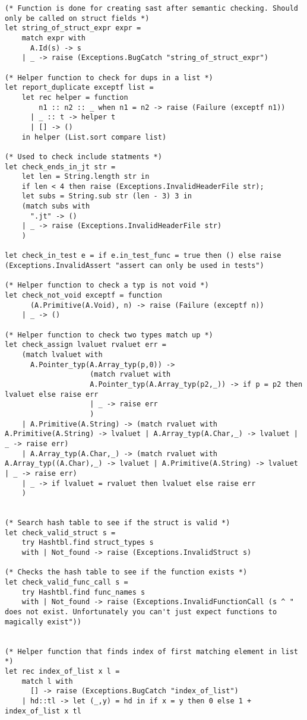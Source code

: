 \documentclass{article}
\begin{document}
\begin{lstlisting}
(* Function is done for creating sast after semantic checking. Should only be called on struct fields *)
let string_of_struct_expr expr = 
	match expr with
	  A.Id(s) -> s
	| _ -> raise (Exceptions.BugCatch "string_of_struct_expr")
	
(* Helper function to check for dups in a list *)
let report_duplicate exceptf list =
    let rec helper = function
        n1 :: n2 :: _ when n1 = n2 -> raise (Failure (exceptf n1))
      | _ :: t -> helper t
      | [] -> ()
    in helper (List.sort compare list)

(* Used to check include statments *)
let check_ends_in_jt str = 
	let len = String.length str in
	if len < 4 then raise (Exceptions.InvalidHeaderFile str);
	let subs = String.sub str (len - 3) 3 in
	(match subs with
	  ".jt" -> ()
	| _ -> raise (Exceptions.InvalidHeaderFile str)
	)

let check_in_test e = if e.in_test_func = true then () else raise (Exceptions.InvalidAssert "assert can only be used in tests")

(* Helper function to check a typ is not void *)
let check_not_void exceptf = function
      (A.Primitive(A.Void), n) -> raise (Failure (exceptf n))
    | _ -> ()

(* Helper function to check two types match up *)
let check_assign lvaluet rvaluet err =
	(match lvaluet with
	  A.Pointer_typ(A.Array_typ(p,0)) -> 
					(match rvaluet with
					A.Pointer_typ(A.Array_typ(p2,_)) -> if p = p2 then lvaluet else raise err
					| _ -> raise err
					)
	| A.Primitive(A.String) -> (match rvaluet with A.Primitive(A.String) -> lvaluet | A.Array_typ(A.Char,_) -> lvaluet | _ -> raise err)
	| A.Array_typ(A.Char,_) -> (match rvaluet with A.Array_typ((A.Char),_) -> lvaluet | A.Primitive(A.String) -> lvaluet | _ -> raise err)
	| _ -> if lvaluet = rvaluet then lvaluet else raise err
	)

     
(* Search hash table to see if the struct is valid *)
let check_valid_struct s =
	try Hashtbl.find struct_types s
	with | Not_found -> raise (Exceptions.InvalidStruct s)

(* Checks the hash table to see if the function exists *)
let check_valid_func_call s = 
	try Hashtbl.find func_names s
	with | Not_found -> raise (Exceptions.InvalidFunctionCall (s ^ " does not exist. Unfortunately you can't just expect functions to magically exist"))


(* Helper function that finds index of first matching element in list *)
let rec index_of_list x l = 
	match l with
	  [] -> raise (Exceptions.BugCatch "index_of_list")
	| hd::tl -> let (_,y) = hd in if x = y then 0 else 1 + index_of_list x tl


\end{lstlisting}
\end{document}
